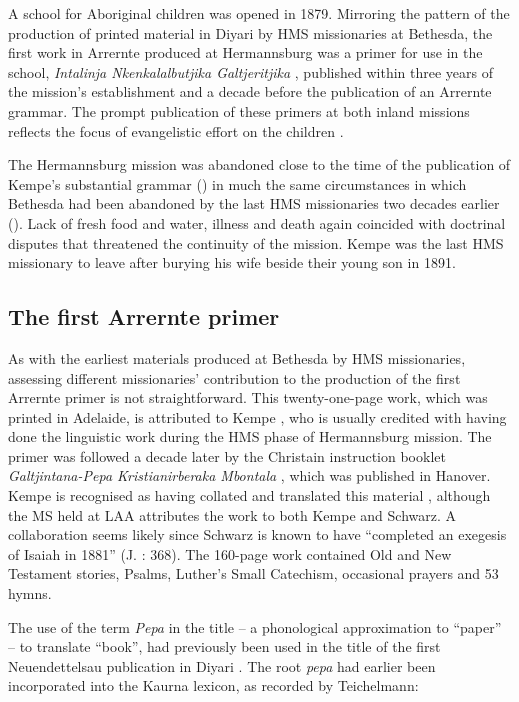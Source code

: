 A school for Aboriginal children was opened in 1879. Mirroring the pattern of the production of printed material in Diyari by HMS missionaries at Bethesda, the first work in Arrernte produced at Hermannsburg was a primer for use in the school, \textit{Intalinja Nkenkalalbutjika Galtjeritjika} \citep{kempe_intalinja_1880}, published within three years of the mission’s establishment and a decade before the publication of an Arrernte grammar. The prompt publication of these primers at both inland missions reflects the focus of evangelistic effort on the children \citep[55]{harms_traume_2003}.

The Hermannsburg mission was abandoned close to the time of the publication of Kempe’s substantial grammar (\citeyear{kempe_grammar_1891}) in much the same circumstances in which Bethesda had been abandoned by the last HMS missionaries two decades earlier (). Lack of fresh food and water, illness and death again coincided with doctrinal disputes that threatened the continuity of the mission. Kempe was the last HMS missionary to leave after burying his wife beside their young son in 1891.

\subsection{The first Arrernte primer}
\label{sec:key:9.1.1}
\largerpage
As with the earliest materials produced at Bethesda by HMS missionaries, assessing different missionaries' contribution to the production of the first Arrernte primer is not straightforward. This twenty-one-page work, which was printed in Adelaide, is attributed to Kempe \citep[103]{graetz_open_1988}, who is usually credited with having done the linguistic work during the HMS phase of Hermannsburg mission. The primer was followed a decade later by the Christain instruction booklet \textit{Galtjintana-Pepa Kristianirberaka Mbontala} \citep{kempe_galtjintana-pepa_1891}, which was published in Hanover. Kempe is recognised as having collated and translated this material \citep[103]{graetz_open_1988}, although the MS held at LAA attributes the work to both Kempe and Schwarz. A collaboration seems likely since Schwarz is known to have “completed an exegesis of Isaiah in 1881” (J. \citealt{strehlow_tale_2011}: 368). The 160-page work contained Old and New Testament stories, Psalms, Luther’s Small Catechism, occasional prayers and 53 hymns.

The use of the term \textit{Pepa} in the title – a phonological approximation to “paper” – to translate “book'', had previously been used in the title of the first Neuendettelsau publication in Diyari \citep{flierl_christianieli_1880}. The root \textit{pepa} had earlier been incorporated into the Kaurna lexicon, as recorded by Teichelmann:

